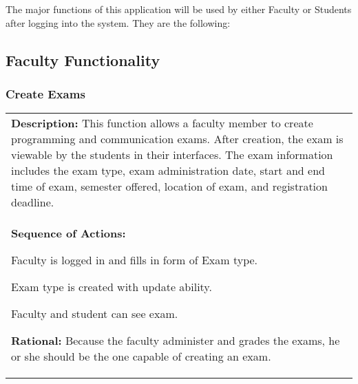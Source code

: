 
\newenvironment{boxed}
 {\begin{center} \begin{tabular}{|p{0.9\textwidth}|}
 \hline
 }
 { 
 \\\hline
 \end{tabular} 
 \end{center}
 }

The major functions of this application will be used by either Faculty or Students
after logging into the system. They are the following:

\subsection{Faculty Functionality}

   \subsubsection{\large Create Exams} 
   \begin{boxed} %
      \textbf{Description:}
      {\small This function allows a faculty member to create programming and
      communication exams. After creation, the exam is viewable by the students
      in their interfaces. The exam information includes the exam type, exam
      administration date, start and end time of exam, semester offered,
      location of exam, and registration deadline.} \\

      \textbf{Sequence of Actions:}
      \begin{enumerate}
            {\small
         \item Faculty is logged in and fills in form of Exam type.
         \item Exam type is created with update ability.
      \item Faculty and student can see exam.}
      \end{enumerate}

      \textbf{Rational:}
      {\small Because the faculty administer and grades the exams, he or she should
      be the one capable of creating an exam.}
   \end{boxed} %

